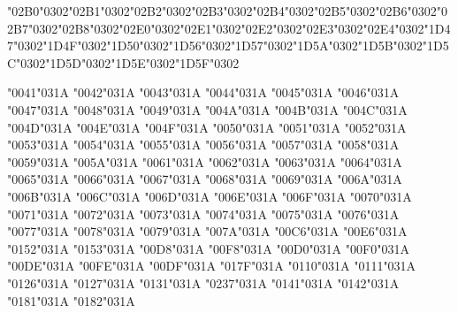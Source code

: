 \documentclass[landscape]{article}
\newcommand{\gs}{\hspace{0.5mm}}	%
\begin{document}
{\char"02B0\char"0302\gs \char"02B1\char"0302\gs \char"02B2\char"0302\gs \char"02B3\char"0302\gs \char"02B4\char"0302\gs \char"02B5\char"0302\gs \char"02B6\char"0302\gs \char"02B7\char"0302\gs \char"02B8\char"0302\gs \char"02E0\char"0302\gs \char"02E1\char"0302\gs \char"02E2\char"0302\gs \char"02E3\char"0302\gs \char"02E4\char"0302\gs \char"1D47\char"0302\gs \char"1D4F\char"0302\gs \char"1D50\char"0302\gs \char"1D56\char"0302\gs \char"1D57\char"0302\gs \char"1D5A\char"0302\gs \char"1D5B\char"0302\gs \char"1D5C\char"0302\gs \char"1D5D\char"0302\gs \char"1D5E\char"0302\gs \char"1D5F\char"0302

{\char"0041\char"031A} {\char"0042\char"031A} {\char"0043\char"031A} {\char"0044\char"031A} {\char"0045\char"031A} {\char"0046\char"031A} {\char"0047\char"031A} {\char"0048\char"031A} {\char"0049\char"031A} {\char"004A\char"031A} {\char"004B\char"031A} {\char"004C\char"031A} {\char"004D\char"031A} {\char"004E\char"031A} {\char"004F\char"031A} {\char"0050\char"031A} {\char"0051\char"031A} {\char"0052\char"031A} {\char"0053\char"031A} {\char"0054\char"031A} {\char"0055\char"031A} {\char"0056\char"031A} {\char"0057\char"031A} {\char"0058\char"031A} {\char"0059\char"031A} {\char"005A\char"031A}
{\char"0061\char"031A} {\char"0062\char"031A} {\char"0063\char"031A} {\char"0064\char"031A} {\char"0065\char"031A} {\char"0066\char"031A} {\char"0067\char"031A} {\char"0068\char"031A} {\char"0069\char"031A} {\char"006A\char"031A} {\char"006B\char"031A} {\char"006C\char"031A} {\char"006D\char"031A} {\char"006E\char"031A} {\char"006F\char"031A} {\char"0070\char"031A} {\char"0071\char"031A} {\char"0072\char"031A} {\char"0073\char"031A} {\char"0074\char"031A} {\char"0075\char"031A} {\char"0076\char"031A} {\char"0077\char"031A} {\char"0078\char"031A} {\char"0079\char"031A} {\char"007A\char"031A}
{\char"00C6\char"031A} {\char"00E6\char"031A} {\char"0152\char"031A} {\char"0153\char"031A} {\char"00D8\char"031A} {\char"00F8\char"031A} {\char"00D0\char"031A} {\char"00F0\char"031A} {\char"00DE\char"031A} {\char"00FE\char"031A} {\char"00DF\char"031A} {\char"017F\char"031A} {\char"0110\char"031A} {\char"0111\char"031A} {\char"0126\char"031A} {\char"0127\char"031A} {\char"0131\char"031A} {\char"0237\char"031A} {\char"0141\char"031A} {\char"0142\char"031A} {\char"0181\char"031A} {\char"0182\char"031A}
	
}
\end{document}
